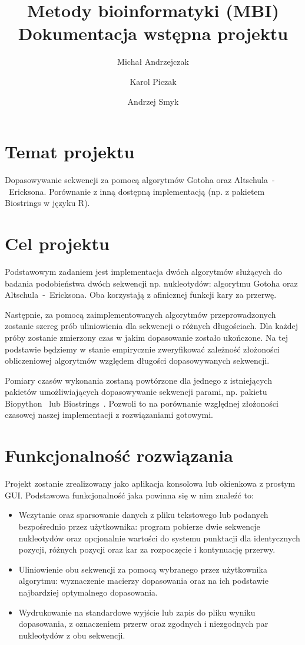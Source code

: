 \documentclass[a4paper,10pt]{article}
\title{Metody bioinformatyki (MBI)\\Dokumentacja wstępna projektu}
\author{Michał Andrzejczak\and Karol Piczak\and	Andrzej Smyk}
\begin{document}
	\maketitle
	\section{Temat projektu}

	Dopasowywanie sekwencji za pomocą algorytmów Gotoha oraz \linebreak\mbox{Altschula - Ericksona}. Porównanie z inną dostępną implementacją (np. z pakietem Biostrings w języku R).

	\section{Cel projektu}

	Podstawowym zadaniem jest implementacja dwóch algorytmów służących do badania podobieństwa dwóch sekwencji np. nukleotydów: algorytmu Gotoha oraz \mbox{Altschula - Ericksona}. Oba korzystają z afinicznej funkcji kary za przerwę. 

	Następnie, za pomocą zaimplementowanych algorytmów przeprowadzonych zostanie szereg prób uliniowienia dla sekwencji o różnych długościach. Dla każdej próby zostanie zmierzony czas w jakim dopasowanie zostało ukończone. Na tej podstawie będziemy w stanie empirycznie zweryfikować zależność złożoności obliczeniowej algorytmów względem długości dopasowywanych sekwencji. 

	Pomiary czasów wykonania zostaną powtórzone dla jednego z istniejących pakietów umożliwiających dopasowywanie sekwencji parami, np. pakietu \mbox{Biopython}~\cite{biopython} lub Biostrings~\cite{biostrings}. Pozwoli to na porównanie względnej złożoności czasowej naszej implementacji z rozwiązaniami gotowymi. 

	\section{Funkcjonalność rozwiązania}

	Projekt zostanie zrealizowany jako aplikacja konsolowa lub okienkowa z prostym GUI. Podstawowa funkcjonalność jaka powinna się w nim znaleźć to:
	\begin{itemize}
		\item Wczytanie oraz sparsowanie danych z pliku tekstowego lub podanych bezpośrednio przez użytkownika: program pobierze dwie sekwencje nukleotydów oraz opcjonalnie wartości do systemu punktacji dla identycznych pozycji, różnych pozycji oraz kar za rozpoczęcie i kontynuację przerwy.
		\item Uliniowienie obu sekwencji za pomocą wybranego przez użytkownika algorytmu: wyznaczenie macierzy dopasowania oraz na ich podstawie najbardziej optymalnego dopasowania. 
		\item Wydrukowanie na standardowe wyjście lub zapis do pliku wyniku dopasowania, z oznaczeniem przerw oraz zgodnych i niezgodnych par nukleotydów z obu sekwencji.
	\end{itemize}
\end{document}
